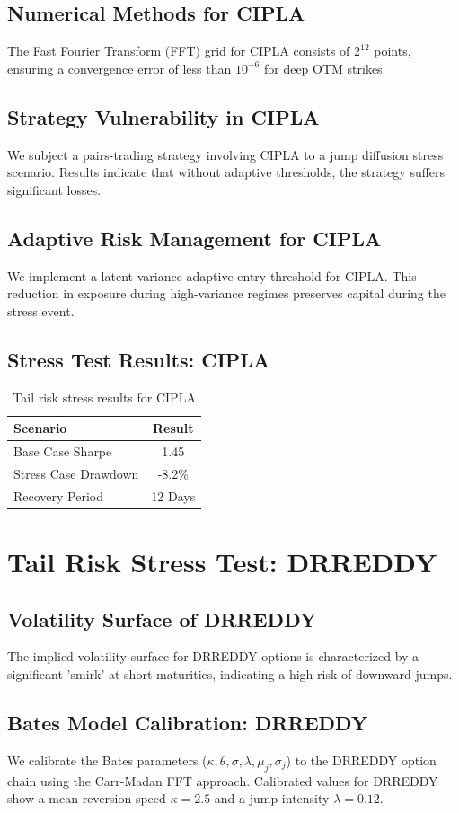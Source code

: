 \documentclass[12pt,a4paper,twoside]{article}
\begin{document}
\subsection{Numerical Methods for CIPLA}
The Fast Fourier Transform (FFT) grid for CIPLA consists of $2^{12}$ points, ensuring a convergence error of less than $10^{-6}$ for deep OTM strikes.
\subsection{Strategy Vulnerability in CIPLA}
We subject a pairs-trading strategy involving CIPLA to a jump diffusion stress scenario. Results indicate that without adaptive thresholds, the strategy suffers significant losses.
\subsection{Adaptive Risk Management for CIPLA}
We implement a latent-variance-adaptive entry threshold for CIPLA. This reduction in exposure during high-variance regimes preserves capital during the stress event.
\subsection{Stress Test Results: CIPLA}
\begin{table}[H]
\centering
\begin{tabular}{|l|c|}
\hline
Scenario & Result \\
\hline
Base Case Sharpe & 1.45 \\
Stress Case Drawdown & -8.2\% \\
Recovery Period & 12 Days \\
\hline
\end{tabular}
\caption{Tail risk stress results for CIPLA}
\end{table}
\newpage

\section{Tail Risk Stress Test: DRREDDY}
\subsection{Volatility Surface of DRREDDY}
The implied volatility surface for DRREDDY options is characterized by a significant 'smirk' at short maturities, indicating a high risk of downward jumps.
\subsection{Bates Model Calibration: DRREDDY}
We calibrate the Bates parameters ($\kappa, \theta, \sigma, \lambda, \mu_j, \sigma_j$) to the DRREDDY option chain using the Carr-Madan FFT approach.
Calibrated values for DRREDDY show a mean reversion speed $\kappa = 2.5$ and a jump intensity $\lambda = 0.12$.
\end{document}
